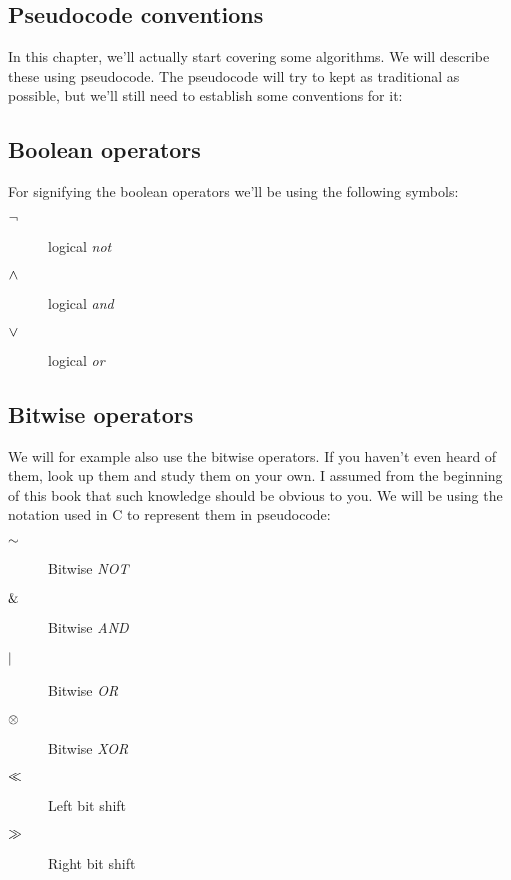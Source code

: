 \begin{refsection}

\section{Pseudocode conventions}
\label{sec:pseud-conv}

In this chapter, we'll actually start covering some algorithms. We
will describe these using pseudocode. The pseudocode will try to kept
as traditional as possible, but we'll still need to establish some
conventions for it:

\subsection{Boolean operators}
\label{sec:boolean-operators}

For signifying the boolean operators we'll be using the following
symbols:

\begin{description}
\item[$\neg$] logical \textit{not}
\item[$\wedge$] logical \textit{and}
\item[$\vee$] logical \textit{or}
\end{description}

\subsection{Bitwise operators}
\label{sec:bitwise-operators}

\newcommand{\C}{\textsc{C}}

We will for example also use the bitwise operators. If you
haven't even heard of them, look up them and study them on your own. I
assumed from the beginning of this book that such knowledge should be
obvious to you. We will be using the notation used in \C{} to
represent them in pseudocode:

\begin{description}
\item[$\mathord{\sim}$] Bitwise \textit{NOT}
\item[$\mathrel{\&}$] Bitwise \textit{AND}
\item[$\mathrel{|}$] Bitwise \textit{OR}
\item[$\mathrel{\otimes}$] Bitwise \textit{XOR}
\item[$\ll$] Left bit shift
\item[$\gg$] Right bit shift
\end{description}


\end{refsection}
